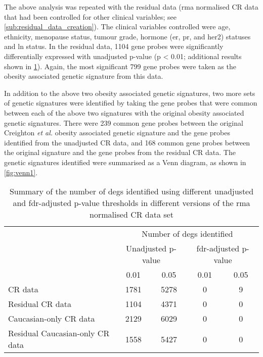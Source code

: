 The above analysis was repeated with the residual data (\gls{rma} normalised CR data that had been controlled for other clinical variables; see \cref{sub:residual_data_creation}).
The clinical variables controlled were age, ethnicity, menopause status, tumour grade, hormone (\gls{er}, \gls{pr}, and \gls{her2}) statuses  and \gls{ln} status.
In the residual data, 1104 gene probes were significantly differentially expressed with unadjusted p-value (p \textless{} 0.01; additional results shown in \cref{tab:ob_deg_summary}).
Again, the most significant 799 gene  probes were taken as the obesity associated genetic signature from this data.

In addition to the above two obesity associated genetic signatures, two more sets of genetic signatures were identified by taking the gene probes that were common between each of the above two signatures with the original obesity associated genetic signatures.
There were 239 common gene probes between the original Creighton \textit{et al.} obesity associated  genetic signature and the gene probes identified from the unadjusted CR data, and 168 common gene probes between the original signature and the gene probes from the residual CR data.
The genetic signatures identified were summarised as a Venn diagram, as shown in \cref{fig:venn1}.
\\

\begin{table}[htpb]
	\centering
	\caption[Summary of the number of \acrshort{deg}s identified using different unadjusted and \acrshort{fdr}-adjusted p-value threshold in different versions of the \gls{rma} normalised CR data set]{Summary of the number of \glspl{deg} identified using different unadjusted and \gls{fdr}-adjusted p-value thresholds in different versions of the \gls{rma} normalised CR data set}
	\label{tab:ob_deg_summary}
	\begin{tabular}{lcccc}
		& \multicolumn{4}{c}{Number of \glspl{deg} identified}\\
		\cmidrule(r){2-5}
		& \multicolumn{2}{c}{Unadjusted p-value} & \multicolumn{2}{c}{\gls{fdr}-adjusted p-value}\\
		\cmidrule(r){2-3} \cmidrule(r){4-5}
		& 0.01 & 0.05 & 0.01 & 0.05\\
		\hline
		\hline
		\rule{0pt}{2.25ex}CR data       & 1781 & 5278 & 0 & 9 \\
		Residual CR data                & 1104 & 4371 & 0 & 0 \\
		Caucasian-only CR data          & 2129 & 6029 & 0 & 0 \\
		Residual Caucasian-only CR data & 1558 & 5427 & 0 & 0 \\
		\hline
		\hline
	\end{tabular}
\end{table}

